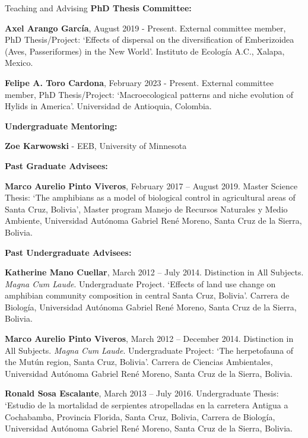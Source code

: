 \documentclass{resume} %
\begin{document}
\begin{rSection}{Teaching and Advising}
\textbf{PhD Thesis Committee:}

\textbf{Axel Arango García}, August 2019 - Present. External committee member, PhD Thesis/Project: `Effects of dispersal on the diversification of Emberizoidea (Aves, Passeriformes) in the New World'. Instituto de Ecología A.C., Xalapa, Mexico. 

\textbf{Felipe A. Toro Cardona}, February 2023 - Present. External committee member, PhD Thesis/Project: `Macroecological patterns and niche evolution of Hylids in America'. Universidad de Antioquia, Colombia. 

\textbf{Undergraduate Mentoring:}

\textbf{Zoe Karwowski} - EEB, University of Minnesota

\textbf{Past Graduate Advisees:}

\textbf{Marco Aurelio Pinto Viveros}, February 2017 – August 2019. Master Science Thesis: `The amphibians as a model of biological control in agricultural areas of Santa Cruz, Bolivia', Master program Manejo de Recursos Naturales y Medio Ambiente, Universidad Autónoma Gabriel René Moreno, Santa Cruz de la Sierra, Bolivia.

\textbf{Past Undergraduate Advisees:}

\textbf{Katherine Mano Cuellar}, March 2012 – July 2014. Distinction in All Subjects. {\em Magna Cum Laude}. Undergraduate Project. `Effects of land use change on amphibian community composition in central Santa Cruz, Bolivia'. Carrera de Biología, Universidad Autónoma Gabriel René Moreno, Santa Cruz de la Sierra, Bolivia.

\textbf{Marco Aurelio Pinto Viveros}, March 2012 – December 2014. Distinction in All Subjects. {\em Magna Cum Laude}. Undergraduate Project: `The herpetofauna of the Mutún region, Santa Cruz, Bolivia'. Carrera de Ciencias Ambientales, Universidad Autónoma Gabriel René Moreno, Santa Cruz de la Sierra, Bolivia.

\textbf{Ronald Sosa Escalante}, March 2013 – July 2016. Undergraduate Thesis: `Estudio de la mortalidad de serpientes atropelladas en la carretera Antigua a Cochabamba, Provincia Florida, Santa Cruz, Bolivia, Carrera de Biología, Universidad Autónoma Gabriel René Moreno, Santa Cruz de la Sierra, Bolivia.

\end{rSection}


\end{document}
